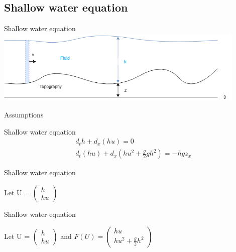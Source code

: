 \documentclass{beamer}
\begin{document}
        \subsection{Shallow water equation}
            \begin{frame}{Shallow water equation}
                \includegraphics[width=12cm]{modele.png}
            \end{frame}
            \begin{frame}{Assumptions}
                \begin{enumerate}
                \end{enumerate}
            \end{frame}
            \begin{frame}{Shallow water equation}
                \begin{align*}
                    &d_t h + d_x(hu) = 0 \\
                    &d_t(hu) + d_x\left( hu^2+ \frac{g}{2}gh^2 \right) = - hgz_x
                \end{align*}
            \end{frame}
            \begin{frame}{Shallow water equation}
                \begin{center}
                    Let U = $\begin{pmatrix} h \\ hu \end{pmatrix}$
                \end{center}
                
            \end{frame}
            \begin{frame}{Shallow water equation}
                \begin{center}
                    Let U = $\begin{pmatrix} h \\ hu \end{pmatrix}$ and $F(U)=\begin{pmatrix} hu \\ hu^2 + \frac{g}{2}h^2 \end{pmatrix}$
                \end{center}
                
            \end{frame}
            
\end{document}
